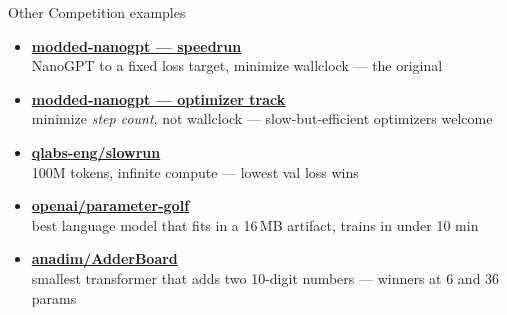 \documentclass[aspectratio=169,10pt]{beamer}
\newcommand{\hl}[1]{{\color{accent}\textbf{#1}}}
\newcommand{\mut}[1]{{\color{muted}#1}}
\begin{document}
\begin{frame}{Other Competition examples}
  \begin{itemize}
    \item \href{https://github.com/KellerJordan/modded-nanogpt}{\hl{modded-nanogpt --- speedrun}}\\
      \mut{NanoGPT to a fixed loss target, minimize wallclock --- the original}
    \smallskip
    \item \href{https://github.com/KellerJordan/modded-nanogpt/tree/master/records/track_3_optimization}{\hl{modded-nanogpt --- optimizer track}}\\
      \mut{minimize \emph{step count}, not wallclock --- slow-but-efficient optimizers welcome}
    \smallskip
    \item \href{https://github.com/qlabs-eng/slowrun}{\hl{qlabs-eng/slowrun}}\\
      \mut{100M tokens, infinite compute --- lowest val loss wins}
    \smallskip
    \item \href{https://github.com/openai/parameter-golf}{\hl{openai/parameter-golf}}\\
      \mut{best language model that fits in a 16\,MB artifact, trains in under 10 min}
    \smallskip
    \item \href{https://github.com/anadim/AdderBoard}{\hl{anadim/AdderBoard}}\\
      \mut{smallest transformer that adds two 10-digit numbers --- winners at 6 and 36 params}
  \end{itemize}
\end{frame}
\end{document}
